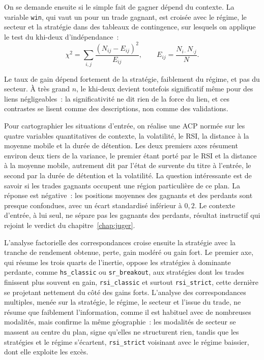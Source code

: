 
On se demande ensuite si le simple fait de gagner dépend du contexte. La
variable \texttt{win}, qui vaut un pour un trade gagnant, est croisée
avec le régime, le secteur et la stratégie dans des tableaux de
contingence, sur lesquels on applique le test du khi-deux
d'indépendance~:
\[
  \chi^2 = \sum_{i,j}\frac{(N_{ij}-E_{ij})^2}{E_{ij}},
  \qquad E_{ij}=\frac{N_{i\cdot}N_{\cdot j}}{N}.
\]


Le taux de gain dépend fortement de la stratégie, faiblement du régime,
et pas du secteur. À très grand \(n\), le khi-deux devient toutefois
significatif même pour des liens négligeables~: la significativité ne
dit rien de la force du lien, et ces contrastes se lisent comme des
descriptions, non comme des validations.


Pour cartographier les situations d'entrée, on réalise une ACP normée
sur les quatre variables quantitatives de contexte, la volatilité, le
RSI, la distance à la moyenne mobile et la durée de détention. Les deux
premiers axes résument environ deux tiers de la variance, le premier
étant porté par le RSI et la distance à la moyenne mobile, autrement dit
par l'état de survente du titre à l'entrée, le second par la durée de
détention et la volatilité. La question intéressante est de savoir si
les trades gagnants occupent une région particulière de ce plan. La
réponse est négative~: les positions moyennes des gagnants et des
perdants sont presque confondues, avec un écart standardisé inférieur à
$0{,}2$. Le contexte d'entrée, à lui seul, ne sépare pas les gagnants
des perdants, résultat instructif qui rejoint le verdict du
chapitre~\ref{chap:juger}.



L'analyse factorielle des correspondances croise ensuite la stratégie
avec la tranche de rendement obtenue, perte, gain modéré ou gain fort.
Le premier axe, qui résume les trois quarts de l'inertie, oppose les
stratégies à dominante perdante, comme \texttt{hs\_classic} ou
\texttt{sr\_breakout}, aux stratégies dont les trades finissent plus
souvent en gain, \texttt{rsi\_classic} et surtout \texttt{rsi\_strict},
cette dernière se projetant nettement du côté des gains forts. L'analyse
des correspondances multiples, menée sur la stratégie, le régime, le
secteur et l'issue du trade, ne résume que faiblement l'information,
comme il est habituel avec de nombreuses modalités, mais confirme la
même géographie~: les modalités de secteur se massent au centre du plan,
signe qu'elles ne structurent rien, tandis que les stratégies et le
régime s'écartent, \texttt{rsi\_strict} voisinant avec le régime
baissier, dont elle exploite les excès.

